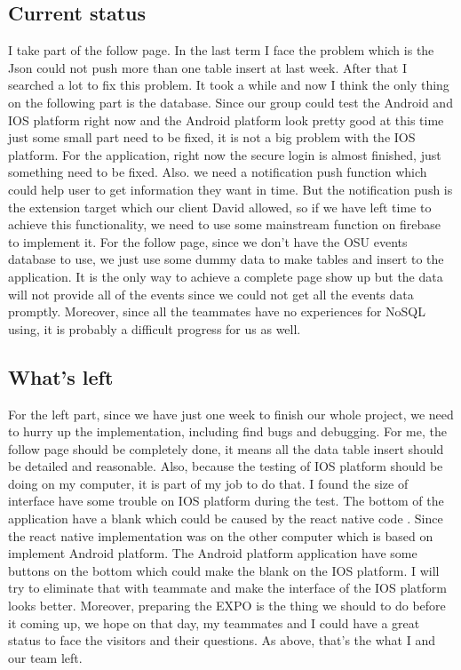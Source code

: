 \documentclass[letterpaper, 10pt,titlepage]{article}
\begin{document}
\subsection{Current status}
I take part of the follow page. In the last term I face the problem which is the Json could not push more than one table insert at last week. After that I searched a lot to fix this problem. It took a while and now I think the only thing on the following part is the database. Since our group could test the Android and IOS platform right now and the Android platform look pretty good at this time just some small part need to be fixed, it is not a big problem with the IOS platform. For the application, right now the secure login is almost finished, just something need to be fixed. Also. we need a notification push function which could help user to get information they want in time. But the notification push is the extension target which our client David allowed, so if we have left time to achieve this functionality, we need to use some mainstream function on firebase to implement it. For the follow page, since we don't have the OSU events database to use, we just use some dummy data to make tables and insert to the application. It is the only way to achieve a complete page show up but the data will not provide all of the events since we could not get all the events data promptly. Moreover, since all the teammates have no experiences for NoSQL using, it is probably a difficult progress for us as well. 

\subsection{What's left}
For the left part, since we have just one week to finish our whole project, we need to hurry up the implementation, including find bugs and debugging. For me, the follow page should be completely done, it means all the data table insert should be detailed and reasonable. Also, because the testing of IOS platform should be doing on my computer, it is part of my job to do that. I found the size of interface have some trouble on IOS platform during the test. The bottom of the application have a blank which could be caused by the react native code . Since the react native implementation was on the other computer which is based on implement Android platform. The Android platform application have some buttons on the bottom which could make the blank on the IOS platform. I will try to eliminate that with teammate and make the interface of the IOS platform looks better. Moreover, preparing the EXPO is the thing we should to do before it coming up, we hope on that day, my teammates and I could have a great status to face the visitors and their questions. As above, that's the what I and our team left.
\end{document}
